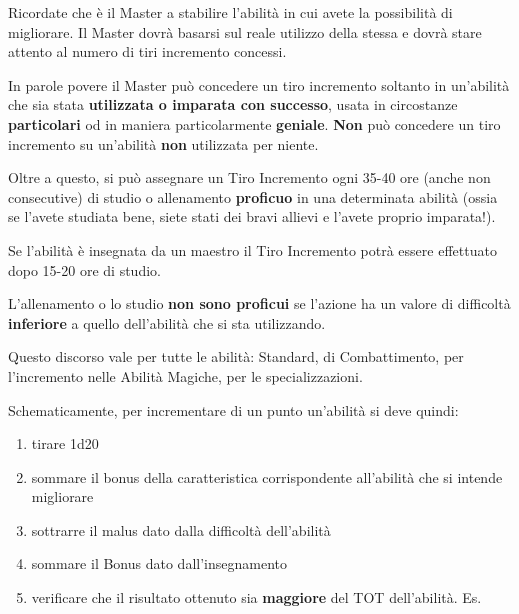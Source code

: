 Ricordate che \`e il Master a stabilire l'abilit\`a in cui avete
la possibilit\`a di migliorare. Il Master dovr\`a basarsi sul
reale utilizzo della stessa e dovr\`a stare attento al numero di
tiri incremento concessi. 

In parole povere il Master pu\`o concedere un tiro incremento soltanto
in un'abilit\`a che sia stata \textbf{utilizzata o imparata con
  successo}, usata in circostanze \textbf{particolari} od in maniera
particolarmente \textbf{geniale}. \textbf{Non} pu\`o concedere un tiro
incremento su un'abilit\`a \textbf{non} utilizzata per niente.

Oltre a questo, si pu\`o assegnare un Tiro Incremento ogni 35-40 ore
(anche non consecutive) di studio o allenamento \textbf{proficuo} in una
determinata abilit\`a (ossia se l'avete studiata bene, siete stati
dei bravi allievi e l'avete proprio imparata!). 

Se l'abilit\`a \`e insegnata da un maestro il Tiro Incremento
potr\`a essere effettuato dopo 15-20 ore di studio. 

L'allenamento o lo studio \textbf{non sono proficui} se l'azione ha un
valore di difficolt\`a \textbf{inferiore} a quello dell'abilit\`a che
si sta utilizzando.


Questo discorso vale per tutte le abilit\`a: Standard, di
Combattimento, per l'incremento nelle Abilit\`a Magiche, per le
specializzazioni.  


Schematicamente, per incrementare di un punto
un'abilit\`a si deve quindi: 
\begin{enumerate}
  \itemsep -6pt
\item tirare 1d20
\item sommare il bonus della caratteristica corrispondente
  all'abilit\`a che si intende migliorare
\item sottrarre il malus dato dalla difficolt\`a dell'abilit\`a
\item sommare il Bonus dato dall'insegnamento
\item verificare che il risultato ottenuto sia \textbf{maggiore} del
  TOT dell'abilit\`a. Es.
\end{enumerate}




